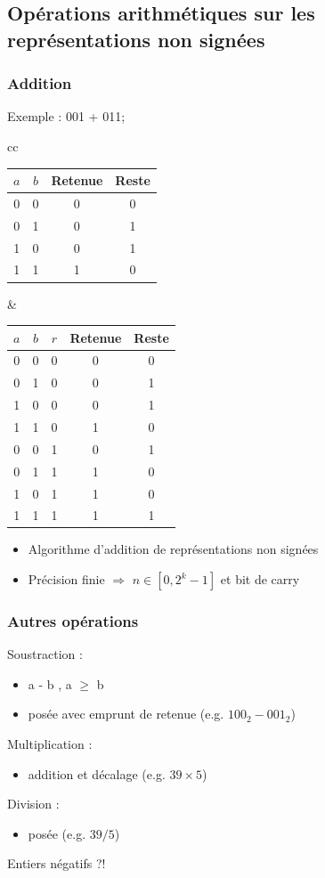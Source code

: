 \documentclass{beamer}
\begin{document}
\subsection{Opérations arithmétiques sur les représentations non signées}

\begin{frame}
\frametitle{Addition}

Exemple : 001 + 011;

\begin{table}[h!]
\centering\begin{tabular}{cc}
\begin{tabular}{cc|cc}
$a$ & $b$ & Retenue & Reste\\
\hline
0 & 0 & 0 & 0\\
0 & 1 & 0 & 1\\
1 & 0 & 0 & 1\\
1 & 1 & 1 & 0
\end{tabular}&
\begin{tabular}{ccc|cc}
$a$ & $b$ & $r$& Retenue & Reste\\
\hline
0 & 0 & 0 & 0 & 0\\
0 & 1 & 0 & 0 & 1\\
1 & 0 & 0 & 0 & 1\\
1 & 1 & 0 & 1 & 0\\
0 & 0 & 1 & 0 & 1\\
0 & 1 & 1 & 1 & 0\\
1 & 0 & 1 & 1 & 0\\
1 & 1 & 1 & 1 & 1
\end{tabular}
\end{tabular}
\end{table}

\begin{itemize}
\item Algorithme d'addition de représentations non signées
\item Précision finie $\Rightarrow$ $n \in [0, 2^{k}-1]$ et bit de carry
\end{itemize}

\end{frame}

\begin{frame}
\frametitle{Autres opérations}
Soustraction : 
\begin{itemize}
\item a - b , a $\geq$ b
\item posée avec emprunt de retenue (e.g. $100_2 - 001_2$)
\end{itemize}
Multiplication :
\begin{itemize}
\item addition et décalage (e.g. $39 \times 5$)
\end{itemize}
Division : 
\begin{itemize}
\item posée  (e.g. $39 / 5$)
\end{itemize}

Entiers négatifs ?!

\end{frame}
\end{document}
